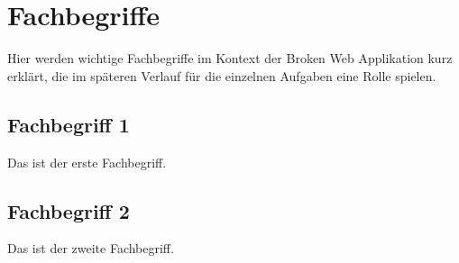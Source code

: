 \chapter{Fachbegriffe}
Hier werden wichtige Fachbegriffe im Kontext der Broken Web Applikation kurz erklärt, die im späteren Verlauf für die einzelnen Aufgaben eine Rolle spielen.


\section{Fachbegriff 1}
Das ist der erste Fachbegriff.

\section{Fachbegriff 2}
Das ist der zweite Fachbegriff.

